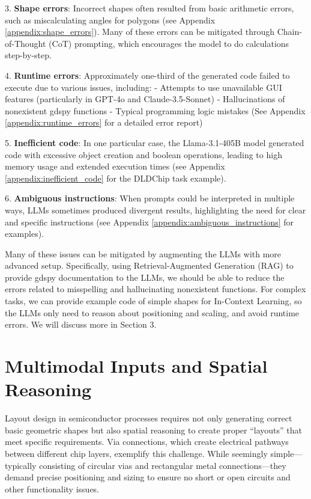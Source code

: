 \documentclass{article}
\begin{document}
3. \textbf{Shape errors}: Incorrect shapes often resulted from basic arithmetic errors, such as miscalculating angles for polygons (see Appendix \ref{appendix:shape_errors}). Many of these errors can be mitigated 
through Chain-of-Thought (CoT) prompting, which 
encourages the model to do calculations step-by-step.

4. \textbf{Runtime errors}: Approximately one-third of the generated code failed to execute due to various issues, including:
   - Attempts to use unavailable GUI features (particularly in GPT-4o and Claude-3.5-Sonnet)
   - Hallucinations of nonexistent gdspy functions
   - Typical programming logic mistakes
   (See Appendix \ref{appendix:runtime_errors} for a detailed error report)

5. \textbf{Inefficient code}: In one particular case, the Llama-3.1-405B model generated code with excessive object creation and boolean operations, leading to high memory usage and extended execution times (see Appendix \ref{appendix:inefficient_code} for the DLDChip task example).

6. \textbf{Ambiguous instructions}: When prompts could be interpreted in multiple ways, LLMs sometimes produced divergent results, highlighting the need for clear and specific instructions (see Appendix \ref{appendix:ambiguous_instructions} for examples).

Many of these issues can be mitigated by augmenting the LLMs with more advanced setup. Specifically, using Retrieval-Augmented Generation (RAG) to provide gdspy documentation to the LLMs, we should be able to reduce the errors related to misspelling and hallucinating nonexistent functions. For complex tasks, we can provide example code of simple shapes for In-Context Learning, so the LLMs only need to reason about positioning and scaling, and avoid runtime errors. We will discuss more in Section 3.

\section{Multimodal Inputs and Spatial Reasoning}
Layout design in semiconductor processes requires not only generating correct basic geometric shapes but also spatial reasoning to create proper ``layouts'' that meet specific requirements. Via connections, which create electrical pathways between different chip layers, exemplify this challenge. While seemingly simple—typically consisting of circular vias and rectangular metal connections—they demand precise positioning and sizing to ensure no short or open circuits and other functionality issues.
\end{document}
